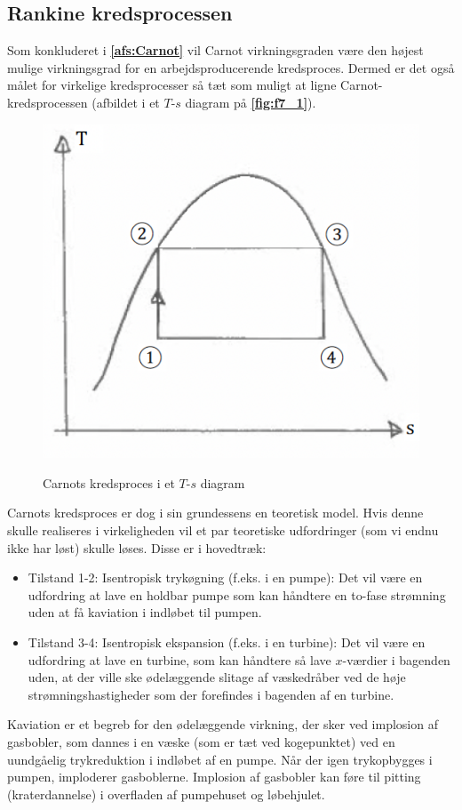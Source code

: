 \subsection{Rankine kredsprocessen}
Som konkluderet i \textbf{\autoref{afs:Carnot}} vil Carnot virkningsgraden være den højest mulige virkningsgrad for en arbejdsproducerende kredsproces. Dermed er det også målet for virkelige kredsprocesser så tæt som muligt at ligne Carnot-kredsprocessen (afbildet i et $T$-$s$ diagram på \textbf{\autoref{fig:f7_1}}). 
\begin{figure} [ht]
  \centering
  \caption{Carnots kredsproces i et $T$-$s$ diagram}
  \includegraphics[width=0.5\linewidth]{./figures/f7_1.png}
  \label{fig:f7_1}
\end{figure}
Carnots kredsproces er dog i sin grundessens en teoretisk model. Hvis denne skulle realiseres i virkeligheden vil et par teoretiske udfordringer (som vi endnu ikke har løst) skulle løses. Disse er i hovedtræk:
\begin{itemize}
  \item Tilstand 1-2: Isentropisk trykøgning (f.eks. i en pumpe): Det vil være en udfordring at lave en holdbar pumpe som kan håndtere en to-fase strømning uden at få kaviation i indløbet til pumpen.
  \item Tilstand 3-4: Isentropisk ekspansion (f.eks. i en turbine): Det vil være en udfordring at lave en turbine, som kan håndtere så lave $x$-værdier i bagenden uden, at der ville ske ødelæggende slitage af væskedråber ved de høje strømningshastigheder som der forefindes i bagenden af en turbine.
\end{itemize}

\begin{definition}[Kaviation]
  Kaviation er et begreb for den ødelæggende virkning, der sker ved implosion af gasbobler, som dannes i en væske (som er tæt ved kogepunktet) ved en uundgåelig trykreduktion i indløbet af en pumpe. Når der igen trykopbygges i pumpen, imploderer gasboblerne. Implosion af gasbobler kan føre til pitting (kraterdannelse) i overfladen af pumpehuset og løbehjulet. 
\end{definition}

